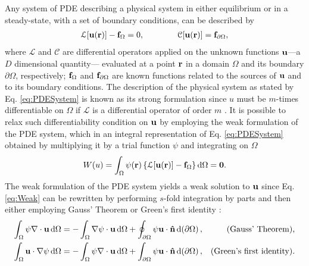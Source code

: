 
Any system of PDE describing a physical system in either equilibrium or in a steady-state, with a set of boundary conditions, can be described by \cite{dhatt_finite_2012}
%
\begin{align}
    \mathcal{L}[\vb{u}(\vb{r})] - \vb{f}_\Omega = 0,
    \qquad\qquad
    \mathcal{C}[\vb{u}(\vb{r})] = \vb{f}_{\partial\Omega},
\label{eq:PDESystem}
\end{align}
%
where $\mathcal{L}$ and $\mathcal{C}$ are differential operators applied on the unknown functions $\vb{u}$---a $D$ dimensional quantity--- evaluated at a point $\vb{r}$ in a domain $\Omega$ and its boundary $\partial\Omega$, respectively;  $\vb{f}_\Omega$ and $\vb{f}_{\partial\Omega}$ are known functions related to the sources of $\vb{u}$ and to its boundary conditions.  The description of the physical system as stated by Eq. \eqref{eq:PDESystem} is known as its strong formulation since $u$ must be $m$-times differentiable on $\Omega$ if $\mathcal{L}$ is a differential operator of order $m$ \cite{dhatt_finite_2012,larson_finite_2013}. It is possible to relax such differentiability condition on $\vb{u}$ by employing the weak formulation of the PDE system, which in an integral representation of Eq. \eqref{eq:PDESystem} obtained by multiplying it by a trial function $\psi$ and integrating on $\Omega$ \cite{dhatt_finite_2012,larson_finite_2013,fletcher_computational_1984}
%
\begin{align}
    W(u) = \int_\Omega \psi(\vb{r}) \left\{ \mathcal{L}[\vb{u}(\vb{r})] - \vb{f}_\Omega   \right\} \dd{\Omega} = \vb{0}.
    \label{eq:Weak}
\end{align}
%
The weak formulation of the PDE system yields a weak solution to $\vb{u}$ since Eq. \eqref{eq:Weak} can be rewritten by performing $s$-fold integration by parts and then either employing Gauss' Theorem or Green's first identity \cite{larson_finite_2013}:
%
\begin{align}
    \int_\Omega \psi \nabla\cdot \vb{u}\dd{\Omega} &=  - \int_\Omega \nabla\psi \cdot \vb{u} \dd{\Omega} + \oint_{\partial\Omega} \psi \vb{u}\cdot \vu{n}\dd{(\partial\Omega)},
        & \mbox{(Gauss' Theorem),}
        \label{eq:GT}
    \\
    \int_\Omega \vb{u}\cdot\nabla\psi \dd{\Omega} &=  - \int_\Omega \psi \nabla\cdot \vb{u}\dd{\Omega}  + \int_{\partial \Omega}\psi \vb{u}\cdot\vu{n}\dd{(\partial\Omega)},
        & \mbox{(Green's first identity).}
        \label{eq:G1I}
\end{align}
